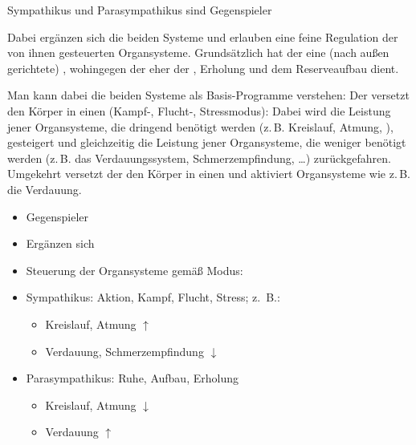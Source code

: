 \TextSlide
{Sympathikus  und Parasympathikus  sind Gegenspieler}%
{%
%
%
\label{topic:sympathikus}%
\label{topic:parasymapthikus}%
Dabei ergänzen sich die beiden Systeme 
und erlauben eine feine Regulation der 
von ihnen gesteuerten Organsysteme. 
%
Grundsätzlich hat der  eine 
(nach außen gerichtete) 
, 
wohingegen der  
eher der , 
Erholung 
und dem Reserveaufbau dient.
%

Man kann dabei die beiden Systeme als Basis-Programme verstehen: 
%
Der  versetzt den Körper in einen  
(Kampf-, Flucht-, Stressmodus): 
%
Dabei wird die Leistung jener Organsysteme, 
die dringend benötigt werden 
(z.\,B. Kreislauf, Atmung, ), 
gesteigert 
und gleichzeitig die Leistung jener Organsysteme, 
die weniger benötigt werden 
(z.\,B. das Verdauungssystem, Schmerzempfindung, {\ldots}) 
zurückgefahren. 
%
Umgekehrt versetzt der  den Körper 
in einen  
und aktiviert Organsysteme 
wie z.\,B. die Verdauung.
}
{%
\begin{itemize}
  \item Gegenspieler
  \item Ergänzen sich
  \item Steuerung der Organsysteme gemäß Modus:
  \item Sympathikus: Aktion, Kampf, Flucht, Stress; z.\, B.:
  \begin{itemize}
    \item Kreislauf, Atmung $\uparrow$
    \item Verdauung, Schmerzempfindung $\downarrow$
  \end{itemize}
  \item Parasympathikus: Ruhe, Aufbau, Erholung
  \begin{itemize}
    \item Kreislauf, Atmung $\downarrow$
    \item Verdauung $\uparrow$ 
  \end{itemize}
\end{itemize}
}%
 


